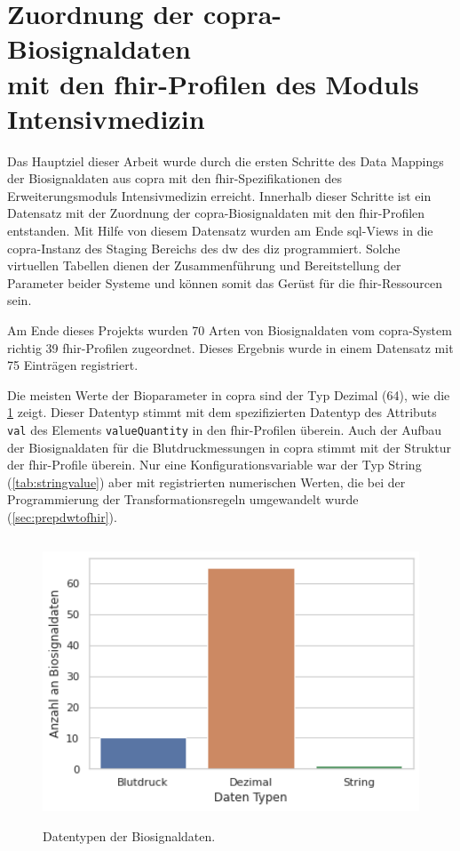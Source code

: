 \section[Zuordnung der \acs{copra}-Biosignaldaten mit den \acs{fhir}-Profilen des Moduls \glqq Intensivmedizin\grqq{}]{Zuordnung der \acs{copra}-Biosignaldaten \\ mit den \acs{fhir}-Profilen des Moduls \glqq Intensivmedizin\grqq{}} \label{sect:resdatamapping}

Das Hauptziel dieser Arbeit wurde durch die ersten Schritte des Data Mappings der Biosignaldaten aus \ac{copra} mit den \ac{fhir}-Spezifikationen des Erweiterungsmoduls \glqq Intensivmedizin\grqq{} erreicht. Innerhalb dieser Schritte ist ein Datensatz mit der Zuordnung der \ac{copra}-Biosignaldaten mit den \ac{fhir}-Profilen entstanden. Mit Hilfe von diesem Datensatz wurden am Ende \ac{sql}-Views in die \ac{copra}-Instanz des Staging Bereichs des \ac{dw} des \ac{diz} programmiert. Solche virtuellen Tabellen dienen der Zusammenführung und Bereitstellung der Parameter beider Systeme und können somit das Gerüst für die \ac{fhir}-Ressourcen sein.

Am Ende dieses Projekts wurden 70 Arten von Biosignaldaten vom \ac{copra}-System richtig 39 \ac{fhir}-Profilen zugeordnet. Dieses Ergebnis wurde in einem Datensatz mit 75 Einträgen registriert.

Die meisten Werte der Bioparameter in \ac{copra} sind der Typ Dezimal (64), wie die \ref{fig:signaldatatyps} zeigt. Dieser Datentyp stimmt mit dem spezifizierten Datentyp des Attributs \texttt{val} des Elements \texttt{valueQuantity} in den \ac{fhir}-Profilen überein. Auch der Aufbau der Biosignaldaten für die Blutdruckmessungen in \ac{copra} stimmt mit der Struktur der \ac{fhir}-Profile überein. Nur eine Konfigurationsvariable war der Typ String (\ref{tab:stringvalue}) aber mit registrierten numerischen Werten, die bei der Programmierung der Transformationsregeln umgewandelt wurde (\ref{sec:prepdwtofhir}).

\begin{figure}[ht]
	\centering
	\includegraphics[height=8.5cm]{figures/biosignal_data_types}
	\caption[Datentypen der Biosignaldaten]{Datentypen der Biosignaldaten.}
	\label{fig:signaldatatyps}
\end{figure}

